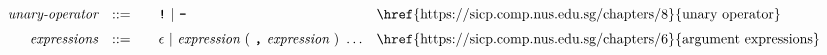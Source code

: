 \begin{alignat*}{9}
&& \textit{unary-operator}    
                        && ::= &\quad && \textbf{\texttt{!}}\ |\ \textbf{\texttt{-}}
                        && \textrm{\href{https://sicp.comp.nus.edu.sg/chapters/8}{unary operator}}\\[1mm]                        
&& \textit{expressions}  && ::= &\quad && \epsilon\ | \ \textit{expression}\ (
                                                               \ \textbf{\texttt{,}} \
                                                                 \textit{expression} \ 
                                                                      )\ \ldots
                                                            && \textrm{\href{https://sicp.comp.nus.edu.sg/chapters/6}{argument expressions}}
\end{alignat*}
